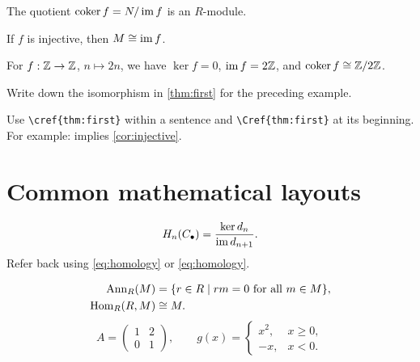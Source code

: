 \documentclass[11pt]{article}
\begin{document}
\begin{prop}[Cokernel]\label{prop:coker}
The quotient \(\operatorname{coker} f=N/\operatorname{im} f\) is an \(R\)-module.
\end{prop}

\begin{cor}\label{cor:injective}
If \(f\) is injective, then \(M\cong\operatorname{im} f\).
\end{cor}

\begin{ex}
For \(f:\mathbb{Z}\to\mathbb{Z}\), \(n\mapsto2n\), we have
\(\ker f=0\), \(\operatorname{im} f=2\mathbb{Z}\), and \(\operatorname{coker} f\cong\mathbb{Z}/2\mathbb{Z}\).
\end{ex}

\begin{prob*}[An exercise]
Write down the isomorphism in \cref{thm:first} for the preceding example.
\end{prob*}

\begin{remark*}
Use \verb|\cref{thm:first}| within a sentence and
\verb|\Cref{thm:first}| at its beginning.
For example:  implies \cref{cor:injective}.
\end{remark*}

\section{Common mathematical layouts}
\begin{equation}\label{eq:homology}
    H_n(C_\bullet)=\frac{\ker d_n}{\operatorname{im} d_{n+1}}.
\end{equation}
Refer back using \cref{eq:homology} or \eqref{eq:homology}.

\begin{align*}
    \operatorname{Ann}_R(M)&=\lbrace r\in R\mid rm=0\text{ for all }m\in M\rbrace,\\
    \operatorname{Hom}_R(R,M)&\cong M.
\end{align*}
\[
    A=\begin{pmatrix}1&2\\0&1\end{pmatrix},
    \qquad
    g(x)=\begin{cases}x^2,&x\geq0,\\-x,&x<0.\end{cases}
\]
\end{document}
